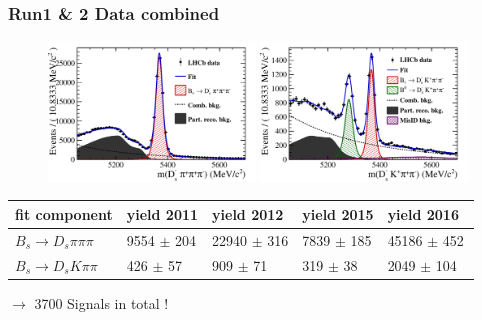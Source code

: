 \documentclass[]{beamer}
\begin{document}
\begin{frame}
\frametitle{Run1 \& 2 Data combined}

\begin{figure}
\includegraphics[width=0.49\textwidth, height = 5.cm]{plots/norm.pdf}
\includegraphics[width=0.49\textwidth, height = 5.cm]{plots/signal.pdf}
\end{figure}

\small

\begin{table}
\centering
 \begin{tabular}{l || l l l l}
fit component & yield 2011 & yield 2012 & yield 2015 & yield 2016\ \\
\hline \hline
$B_{s}\to D_{s}\pi\pi\pi$ & 9554 $\pm$ 204 & 22940 $\pm$ 316 & 7839 $\pm$ 185 & 45186 $\pm$ 452 \\
\hline
$B_{s}\to D_{s}K\pi\pi$ & 426 $\pm$ 57 & 909 $\pm$ 71 & 319 $\pm$ 38 & 2049 $\pm$ 104 \\
\hline
\end{tabular}
\end{table}

\normalsize

$\rightarrow$ 3700 Signals in total ! 


\end{frame}
\end{document}
